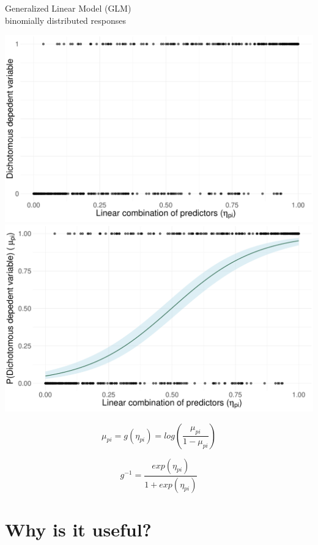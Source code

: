 \documentclass{beamer}
\begin{document}
\begin{frame}

\begin{center}
	Generalized Linear Model (GLM)\\
	\small binomially distributed responses
\end{center}

	\begin{overprint}
					\centering
					\includegraphics[width=.70\linewidth]{baseGLM.pdf}
			\onslide<2->
				\centering
				\includegraphics[width=.70\linewidth]{linkGLM.pdf}
	\end{overprint}


		\begin{equation*}
	\mu_{pi} = g(\eta_{pi}) = log\left(\frac{\mu_{pi}}{1 - \mu_{pi}}\right)
\end{equation*}

\begin{equation*}
	g^{-1} = \frac{exp(\eta_{pi})}{1 + exp(\eta_{pi})}
\end{equation*}
\end{frame}


\section{Why is it useful?}
\end{document}
